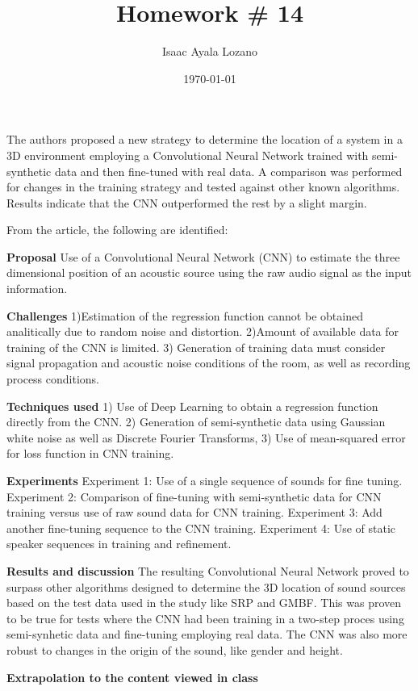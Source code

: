 \documentclass[a4paper,10pt]{article}
\title{Homework \# 14}
\author{Isaac Ayala Lozano}
\date{\today}
\begin{document}
\maketitle

The authors
proposed a new strategy to determine the location of a system in a 3D environment employing a Convolutional Neural Network trained with semi-synthetic data and then fine-tuned with real data.
A comparison was performed for changes in the training strategy and tested against other known algorithms.
Results indicate that the CNN outperformed the rest by a slight margin.

From the article, the following are identified:

\textbf{Proposal} Use of a Convolutional Neural Network (CNN) to estimate the three dimensional position of an acoustic source using the raw audio signal as the input information.

 \textbf{Challenges}
 1)Estimation of the regression function cannot be obtained analitically due to random noise and distortion.
 2)Amount of available data for training of the CNN is limited.
 3) Generation of training data must consider signal propagation and acoustic noise conditions of the room, as well as recording process conditions.

 \textbf{Techniques used}
 1) Use of Deep Learning to obtain a regression function directly from the CNN.
 2) Generation of semi-synthetic data using Gaussian white noise as well as Discrete Fourier Transforms,
 3) Use of mean-squared error for loss function in CNN training.


 \textbf{Experiments}
 Experiment 1: Use of a single sequence of sounds for fine tuning.
 Experiment 2: Comparison of fine-tuning with semi-synthetic data for CNN training versus use of raw sound data for CNN training.
 Experiment 3: Add another fine-tuning sequence to the CNN training.
 Experiment 4: Use of static speaker sequences in training and refinement.

 \textbf{Results and discussion}
The resulting Convolutional Neural Network proved to surpass other algorithms designed to determine the 3D location of sound sources based on the test data used in the study like SRP and GMBF.
This was proven to be true for tests where the CNN had been training in a two-step proces using semi-synhetic data and fine-tuning employing real data.
The CNN was also more robust to changes in the origin of the sound, like gender and height.

\textbf{Extrapolation to the content viewed in class}
\end{document}
